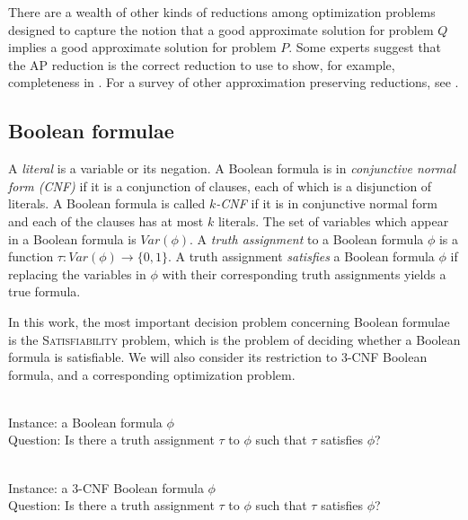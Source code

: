 \documentclass[]{article}
\newenvironment{instance}{\\Instance:}{}
\newenvironment{question}{\\Question:}{}
\begin{document}
There are a wealth of other kinds of reductions among optimization problems designed to capture the notion that a good approximate solution for problem $Q$ implies a good approximate solution for problem $P$.
Some experts suggest that the AP reduction is the correct reduction to use to show, for example, completeness in \APX.
For a survey of other approximation preserving reductions, see \cite{crescenzi97}.

\subsection{Boolean formulae}

A \emph{literal} is a variable or its negation.
A Boolean formula is in \emph{conjunctive normal form (CNF)} if it is a conjunction of clauses, each of which is a disjunction of literals.
A Boolean formula is called \emph{$k$-CNF} if it is in conjunctive normal form and each of the clauses has at most $k$ literals.
The set of variables which appear in a Boolean formula is $Var(\phi)$.
A \emph{truth assignment} to a Boolean formula $\phi$ is a function $\tau \colon Var(\phi) \to \{0, 1\}$.
A truth assignment \emph{satisfies} a Boolean formula $\phi$ if replacing the variables in $\phi$ with their corresponding truth assignments yields a true formula.

In this work, the most important decision problem concerning Boolean formulae is the \textsc{Satisfiability} problem, which is the problem of deciding whether a Boolean formula is satisfiable.
We will also consider its restriction to 3-CNF Boolean formula, and a corresponding optimization problem.

\begin{definition}
  \mbox{}
  \begin{instance}
    a Boolean formula $\phi$
  \end{instance}
  \begin{question}
    Is there a truth assignment $\tau$ to $\phi$ such that $\tau$ satisfies $\phi$?
  \end{question}
\end{definition}

\begin{definition}
  \mbox{}
  \begin{instance}
    a 3-CNF Boolean formula $\phi$
  \end{instance}
  \begin{question}
    Is there a truth assignment $\tau$ to $\phi$ such that $\tau$ satisfies $\phi$?
  \end{question}
\end{definition}
\end{document}
